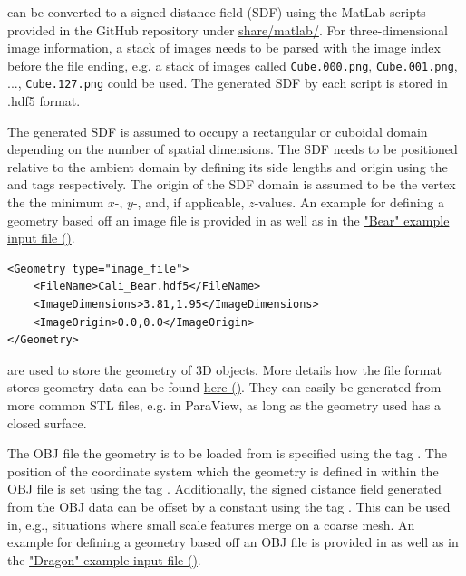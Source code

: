  can be converted to a signed distance field (SDF) using the MatLab scripts provided in the GitHub repository under \href{https://github.com/kkmaute/moris/tree/main/share/matlab}{share/matlab/}. For three-dimensional image information, a stack of images needs to be parsed with the image index before the file ending, e.g. a stack of images called \texttt{Cube.000.png}, \texttt{Cube.001.png}, ..., \texttt{Cube.127.png} could be used.
The generated SDF by each script is stored in .hdf5 format. 

The generated SDF is assumed to occupy a rectangular or cuboidal domain depending on the number of spatial dimensions. The SDF needs to be positioned relative to the ambient domain by defining its side lengths and origin using the  and  tags respectively. The origin of the SDF domain is assumed to be the vertex the the minimum $x$-, $y$-, and, if applicable, $z$-values. An example for defining a geometry based off an image file is provided in  as well as in the \href{https://github.com/kkmaute/moris/blob/main/share/doc/mesh_generation/examples/Bear_Example.xml}{"Bear" example input file (\ExternalLink)}.

\begin{minipage}{\linewidth}
\vspace{0.5cm}
\begin{lstlisting}[caption={Example parameters for an image file as provided in one of the examples.},captionpos=b, label={lst:image}]
<Geometry type="image_file"> 
    <FileName>Cali_Bear.hdf5</FileName>
    <ImageDimensions>3.81,1.95</ImageDimensions>
    <ImageOrigin>0.0,0.0</ImageOrigin>
</Geometry>
\end{lstlisting}
\end{minipage}

 are used to store the geometry of 3D objects.
More details how the file format stores geometry data can be found \href{https://en.wikipedia.org/wiki/Wavefront_.obj_file}{here (\ExternalLink)}. They can easily be generated from more common STL files, e.g. in ParaView, as long as the geometry used has a closed surface.

The OBJ file the geometry is to be loaded from is specified using the tag . The position of the coordinate system which the geometry is defined in within the OBJ file is set using the tag . Additionally, the signed distance field generated from the OBJ data can be offset by a constant using the tag . This can be used in, e.g., situations where small scale features merge on a coarse mesh.
An example for defining a geometry based off an OBJ file is provided in  as well as in the \href{https://github.com/kkmaute/moris/blob/main/share/doc/mesh_generation/examples/Dragon_Example.xml}{"Dragon" example input file (\ExternalLink)}.

